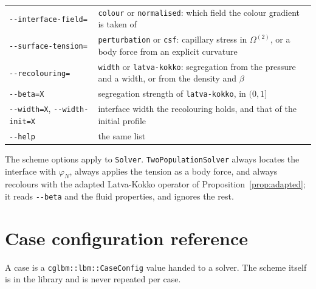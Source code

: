 \documentclass[11pt,a4paper]{article}
\theoremstyle{plain}
\theoremstyle{definition}
\begin{document}
\begin{center}
\begin{tabular}{lp{9.2cm}}
\texttt{-{-}interface-field=} & \texttt{colour} or \texttt{normalised}: which field the colour gradient is taken of \\
\texttt{-{-}surface-tension=} & \texttt{perturbation} or \texttt{csf}: capillary stress in $\Omega^{(2)}$, or a body force from an explicit curvature \\
\texttt{-{-}recolouring=} & \texttt{width} or \texttt{latva-kokko}: segregation from the pressure and a width, or from the density and $\beta$ \\
\texttt{-{-}beta=X}   & segregation strength of \texttt{latva-kokko}, in $(0, 1]$ \\
\texttt{-{-}width=X}, \texttt{-{-}width-init=X} & interface width the recolouring holds, and that of the initial profile \\
\texttt{-{-}help}     & the same list \\
\bottomrule
\end{tabular}
\end{center}

The scheme options apply to \texttt{Solver}. \texttt{TwoPopulationSolver} always
locates the interface with $\varphi_N$, always applies the tension as a body
force, and always recolours with the adapted Latva-Kokko operator of
Proposition~\ref{prop:adapted}; it reads \texttt{-{-}beta} and the fluid
properties, and ignores the rest.

\section{Case configuration reference}
\label{sec:config}

A case is a \texttt{cglbm::lbm::CaseConfig} value handed to a solver. The
scheme itself is in the library and is never repeated per case.
\end{document}
